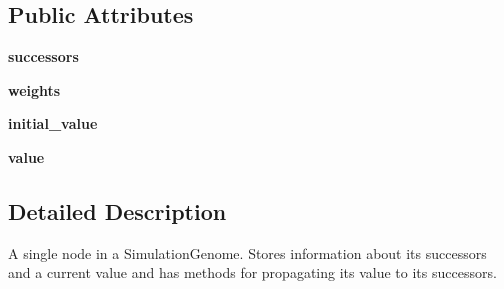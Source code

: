 \subsection*{Public Attributes}
\begin{DoxyCompactItemize}
\item 
{\bfseries successors}\hypertarget{class_n_e_a_t___py_genetics_1_1_n_e_a_t_1_1_genome_structures_1_1_simulation_structure_1_1_simulation_nodes_1_1_node_a7eb303cad09b69f01466fd6287c895c4}{}\label{class_n_e_a_t___py_genetics_1_1_n_e_a_t_1_1_genome_structures_1_1_simulation_structure_1_1_simulation_nodes_1_1_node_a7eb303cad09b69f01466fd6287c895c4}

\item 
{\bfseries weights}\hypertarget{class_n_e_a_t___py_genetics_1_1_n_e_a_t_1_1_genome_structures_1_1_simulation_structure_1_1_simulation_nodes_1_1_node_a0e8535438a367cd12a2eb47dee280f36}{}\label{class_n_e_a_t___py_genetics_1_1_n_e_a_t_1_1_genome_structures_1_1_simulation_structure_1_1_simulation_nodes_1_1_node_a0e8535438a367cd12a2eb47dee280f36}

\item 
{\bfseries initial\+\_\+value}\hypertarget{class_n_e_a_t___py_genetics_1_1_n_e_a_t_1_1_genome_structures_1_1_simulation_structure_1_1_simulation_nodes_1_1_node_ae6a237c61d2c2118e6310f254c824490}{}\label{class_n_e_a_t___py_genetics_1_1_n_e_a_t_1_1_genome_structures_1_1_simulation_structure_1_1_simulation_nodes_1_1_node_ae6a237c61d2c2118e6310f254c824490}

\item 
{\bfseries value}\hypertarget{class_n_e_a_t___py_genetics_1_1_n_e_a_t_1_1_genome_structures_1_1_simulation_structure_1_1_simulation_nodes_1_1_node_af25b687b957169788a4190545d6dd90c}{}\label{class_n_e_a_t___py_genetics_1_1_n_e_a_t_1_1_genome_structures_1_1_simulation_structure_1_1_simulation_nodes_1_1_node_af25b687b957169788a4190545d6dd90c}

\end{DoxyCompactItemize}


\subsection{Detailed Description}
\begin{DoxyVerb}A single node in a SimulationGenome. Stores information about its successors
 and a current value and has methods for propagating its value to its
 successors.
\end{DoxyVerb}
 

